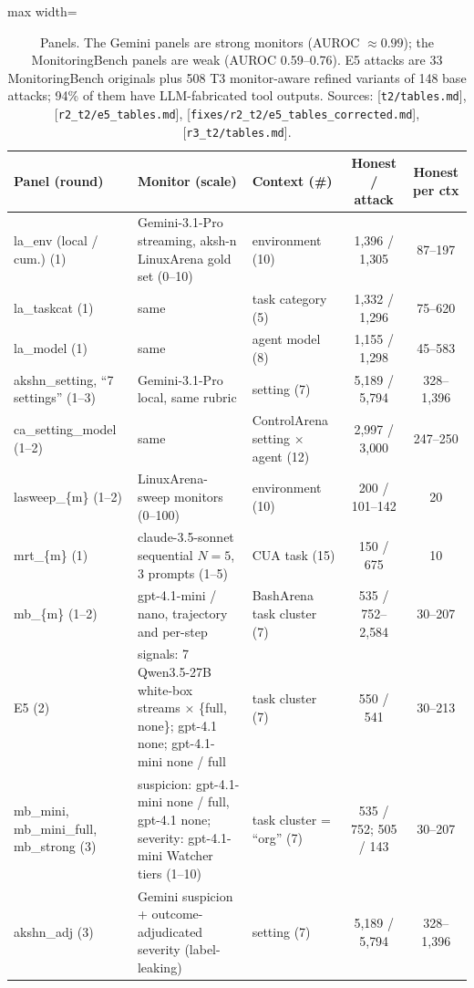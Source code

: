\documentclass[11pt]{article}
\newcommand{\src}[1]{{\footnotesize\textcolor{ink2}{[\nolinkurl{#1}]}}}
\begin{document}
\begin{table}[!htb]\centering\small
\begin{adjustbox}{max width=\linewidth}
\begin{tabular}{@{}>{\raggedright\arraybackslash}p{3.3cm}>{\raggedright\arraybackslash}p{5.6cm}>{\raggedright\arraybackslash}p{3.0cm}cc@{}}
\toprule
Panel (round) & Monitor (scale) & Context (\#) & Honest / attack & Honest per ctx\\
\midrule
la\_env (local / cum.) (1) & Gemini-3.1-Pro streaming, aksh-n LinuxArena gold set (0--10) & environment (10) & 1{,}396 / 1{,}305 & 87--197\\
la\_taskcat (1) & same & task category (5) & 1{,}332 / 1{,}296 & 75--620\\
la\_model (1) & same & agent model (8) & 1{,}155 / 1{,}298 & 45--583\\
akshn\_setting, ``7 settings'' (1--3) & Gemini-3.1-Pro local, same rubric & setting (7) & 5{,}189 / 5{,}794 & 328--1{,}396\\
ca\_setting\_model (1--2) & same & ControlArena setting $\times$ agent (12) & 2{,}997 / 3{,}000 & 247--250\\
lasweep\_\{m\} (1--2) & 12 LinuxArena-sweep monitors (0--100) & environment (10) & 200 / 101--142 & 20\\
mrt\_\{m\} (1) & claude-3.5-sonnet sequential $N=5$, 3 prompts (1--5) & CUA task (15) & 150 / 675 & 10\\
mb\_\{m\} (1--2) & gpt-4.1-mini / nano, trajectory and per-step & BashArena task cluster (7) & 535 / 752--2{,}584 & 30--207\\
E5 (2) & 17 signals: 7 Qwen3.5-27B white-box streams $\times$ \{full, none\}; gpt-4.1 none; gpt-4.1-mini none / full & task cluster (7) & 550 / 541 & 30--213\\
mb\_mini, mb\_mini\_full, mb\_strong (3) & suspicion: gpt-4.1-mini none / full, gpt-4.1 none; severity: gpt-4.1-mini Watcher tiers (1--10) & task cluster = ``org'' (7) & 535 / 752; 505 / 143 & 30--207\\
akshn\_adj (3) & Gemini suspicion + outcome-adjudicated severity (label-leaking) & setting (7) & 5{,}189 / 5{,}794 & 328--1{,}396\\
\bottomrule
\end{tabular}\end{adjustbox}
\caption{Panels. The Gemini panels are strong monitors (AUROC $\approx0.99$); the MonitoringBench panels are weak (AUROC 0.59--0.76). E5 attacks are 33 MonitoringBench originals plus 508 T3 monitor-aware refined variants of 148 base attacks; 94\% of them have LLM-fabricated tool outputs. Sources: \src{t2/tables.md}, \src{r2_t2/e5_tables.md}, \src{fixes/r2_t2/e5_tables_corrected.md}, \src{r3_t2/tables.md}.}
\end{table}
\end{document}

